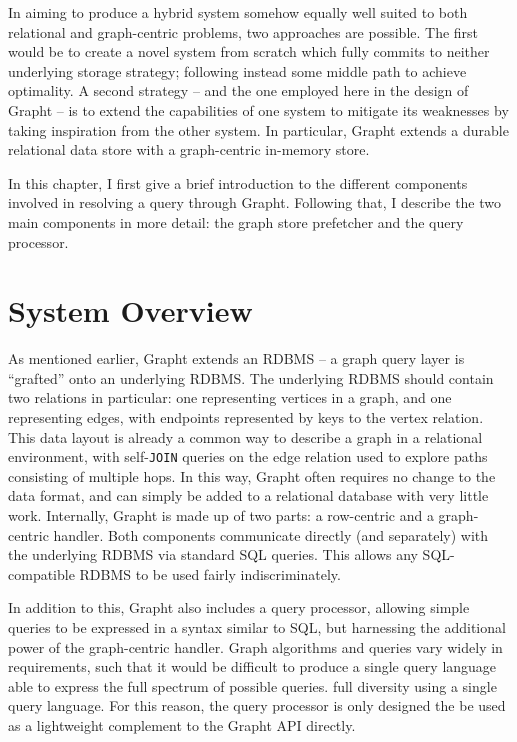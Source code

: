 
In aiming to produce a hybrid system somehow equally well suited to both
relational and graph-centric problems, two approaches are possible. The first would be to create a
novel system from scratch which fully commits to neither underlying storage
strategy; following instead some middle path to achieve optimality. A second
strategy -- and the one employed here in the design of Grapht -- is to extend
the capabilities of one system to mitigate its weaknesses by taking inspiration
from the other system. In particular, Grapht extends a durable relational data
store with a graph-centric in-memory store.

In this chapter, I first give a brief introduction to the different components
involved in resolving a query through Grapht. Following that, I describe the
two main components in more detail: the graph store prefetcher and the query
processor.






\section{System Overview}

As mentioned earlier, Grapht extends an RDBMS -- a graph query
layer is ``grafted'' onto an underlying RDBMS. The underlying RDBMS should
contain two relations in particular: one representing vertices in a graph,
and one representing edges, with endpoints represented by keys to the vertex
relation. This data layout is already a common way to describe a graph in a
relational environment, with self-\texttt{JOIN} queries on the edge relation
used to explore paths consisting of multiple hops. In this way, Grapht often
requires no change to the data format, and can simply be added to a relational
database with very little work. Internally, Grapht is made up of two
parts: a row-centric and a graph-centric handler. Both components communicate
directly (and separately) with the underlying RDBMS via standard SQL queries.
This allows any SQL-compatible RDBMS to be used fairly indiscriminately.

In addition to this, Grapht also includes a query processor, allowing simple
queries to be expressed in a syntax similar to SQL, but harnessing the
additional power of the graph-centric handler. Graph algorithms and queries
vary widely in requirements, such that it would be difficult to produce a single query language able to express the full spectrum of possible queries.
full diversity using a single query language. For this reason, the query
processor is only designed the be used  as a lightweight complement to the
Grapht API directly. 

